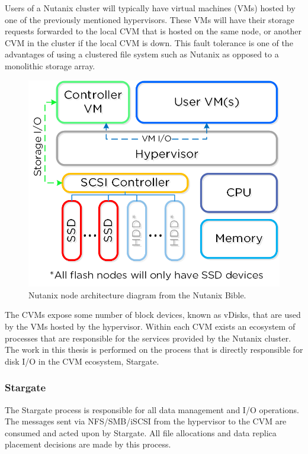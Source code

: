 \documentclass[12pt]{article}
\begin{document}
    Users of a Nutanix cluster will typically have virtual machines (VMs)
    hosted by one of the previously mentioned hypervisors. These VMs will have
    their storage requests forwarded to the local CVM that is hosted on the
    same node, or another CVM in the cluster if the local CVM is down. This
    fault tolerance is one of the advantages of using a clustered file system
    such as Nutanix as opposed to a monolithic storage array.
    
    \begin{figure}[htbp]
      \centering
      \includegraphics[scale=1.0]{images/converged_platform.png} 
      \caption{Nutanix node architecture diagram from the Nutanix Bible.}
      \label{fig:adsf-architecture}
    \end{figure}

    The CVMs expose some number of block devices, known as vDisks, that are
    used by the VMs hosted by the hypervisor. Within each CVM exists an
    ecosystem of processes that are responsible for the services provided by
    the Nutanix cluster. The work in this thesis is performed on the process
    that is directly responsible for disk I/O in the CVM ecosystem, Stargate.

    \subsubsection{Stargate} \label{section-stargate}

    The Stargate process is responsible for all data management and I/O
    operations. The messages sent via NFS/SMB/iSCSI from the hypervisor to the
    CVM are consumed and acted upon by Stargate. All file allocations and data
    replica placement decisions are made by this process.
\end{document}
